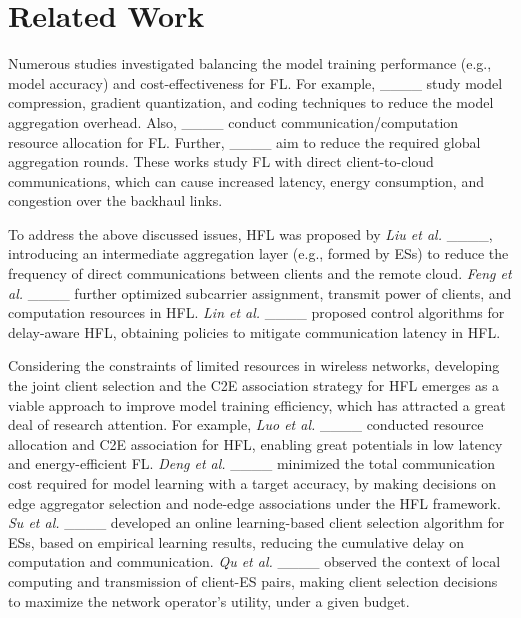 \section{Related Work}
Numerous studies investigated balancing the model training performance (e.g., model accuracy) and cost-effectiveness for FL. For example, ____ study model compression, gradient quantization, and coding techniques to reduce the model aggregation overhead. Also, ____ conduct communication/computation resource allocation for FL. Further, ____ aim to reduce the required global aggregation rounds. These works study FL with direct client-to-cloud communications, which can cause increased latency, energy consumption, and congestion over the backhaul links.

To address the above discussed issues, HFL was proposed by \textit{Liu et al.} ____, introducing an intermediate aggregation layer (e.g., formed by ESs) to reduce the frequency of direct communications between clients and the remote cloud. \textit {Feng et al.} ____ further optimized subcarrier assignment, transmit power of clients, and computation resources in HFL. \textit {Lin et al.} ____ proposed control algorithms for delay-aware HFL, obtaining policies to mitigate communication latency in HFL. 

Considering the constraints of limited resources in wireless networks, developing the joint client selection and the C2E association strategy for HFL emerges as a viable approach to improve model training efficiency, which has attracted a great deal of research attention. For example, \textit {Luo et al.} ____ conducted resource allocation and C2E association for HFL, enabling great potentials in low latency and energy-efficient FL. \textit{Deng et al.} ____ minimized the total communication cost required for model learning with a target accuracy, by making decisions on edge aggregator selection and node-edge associations under the HFL framework. \textit{Su et al.} ____ developed an online learning-based client selection algorithm for ESs, based on empirical learning results, reducing the cumulative delay on computation and communication. \textit{Qu et al.} ____ observed the context of local computing and transmission of client-ES pairs, making client selection decisions to maximize the network operator’s utility, under a given budget. 

